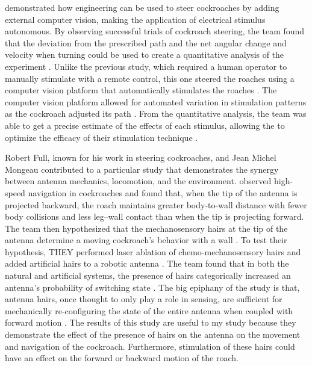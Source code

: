 \citet{whitmire2013kinect} demonstrated how engineering can be used to steer cockroaches by adding external computer vision, making the application of electrical stimulus autonomous. By observing successful trials of cockroach steering, the team found that the deviation from the prescribed path and the net angular change and velocity when turning could be used to create a quantitative analysis of the experiment \citep{whitmire2013kinect}. Unlike the previous study, which required a human operator to manually stimulate with a remote control, this one steered the roaches using a computer vision platform that automatically stimulates the roaches \citep{whitmire2013kinect}. The computer vision platform allowed for automated variation in stimulation patterns as the cockroach adjusted its path \citep{whitmire2013kinect}. From the quantitative analysis, the team was able to get a precise estimate of the effects of each stimulus, allowing the to optimize the efficacy of their stimulation technique \citep{whitmire2013kinect}. 

Robert Full, known for his work in steering cockroaches, and Jean Michel Mongeau contributed to a particular study that demonstrates the synergy between antenna mechanics, locomotion, and the environment. \citet{Mongeau2014} observed high-speed navigation in cockroaches and found that, when the tip of the antenna is projected backward, the roach maintains greater body-to-wall distance with fewer body collisions and less leg–wall contact than when the tip is projecting forward. The team then hypothesized that the mechanosensory hairs at the tip of the antenna determine a moving cockroach's behavior with a wall \citep{Mongeau2014}. To test their hypothesis, THEY performed laser ablation of chemo-mechanosensory hairs and added artificial hairs to a robotic antenna \citep{Mongeau2014}. The team found that in both the natural and artificial systems, the presence of hairs categorically increased an antenna’s probability of switching state \citep{Mongeau2014}. The big epiphany of the study is that, antenna hairs, once thought to only play a role in sensing, are sufficient for mechanically re-configuring the state of the entire antenna when coupled with forward motion \citep{Mongeau2014}. The results of this study are useful to my study because they demonstrate the effect of the presence of hairs on the antenna on the movement and navigation of the cockroach. Furthermore, stimulation of these hairs could have an effect on the forward or backward motion of the roach.

